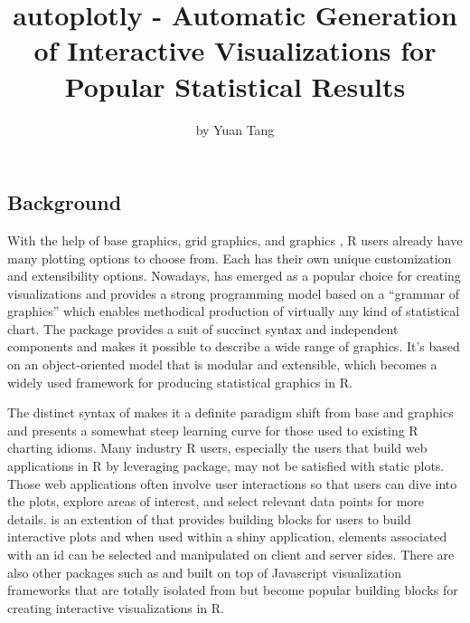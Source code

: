 \title{autoplotly - Automatic Generation of Interactive Visualizations for
Popular Statistical Results}
\author{by Yuan Tang}

\maketitle


\subsection{Background}\label{background}

With the help of base graphics, grid graphics, and 
graphics \citep{lattice}, R users already have many plotting options to
choose from. Each has their own unique customization and extensibility
options. Nowadays,  has emerged as a popular choice for
creating visualizations \citep{wickham2009ggplot2} and provides a strong
programming model based on a ``grammar of graphics'' which enables
methodical production of virtually any kind of statistical chart. The
 package provides a suit of succinct syntax and independent
components and makes it possible to describe a wide range of graphics.
It's based on an object-oriented model that is modular and extensible,
which becomes a widely used framework for producing statistical graphics
in R.

The distinct syntax of  makes it a definite paradigm shift
from base and  graphics and presents a somewhat steep
learning curve for those used to existing R charting idioms. Many
industry R users, especially the users that build web applications in R
by leveraging  \citep{shiny} package, may not be
satisfied with static plots. Those web applications often involve user
interactions so that users can dive into the plots, explore areas of
interest, and select relevant data points for more details.
 \citep{ggiraph} is an extention of  that
provides building blocks for users to build interactive plots and when
used within a shiny application, elements associated with an id can be
selected and manipulated on client and server sides. There are also
other packages such as  \citep{d3r} and 
\citep{plotly} built on top of Javascript visualization frameworks that
are totally isolated from  but become popular building
blocks for creating interactive visualizations in R.

